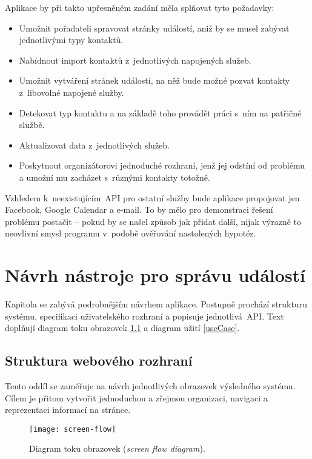 \documentclass[12pt,oneside,final]{fithesis2}
\begin{document}
Aplikace by při takto upřesněném zadání měla splňovat tyto požadavky:

\begin{itemize}
    \item Umožnit pořadateli spravovat stránky událostí, aniž by se musel zabývat jednotlivými typy kontaktů.
    \item Nabídnout import kontaktů z~jednotlivých napojených služeb.
    \item Umožnit vytváření stránek událostí, na něž bude možné pozvat kontakty z~libovolné napojené služby.
    \item Detekovat typ kontaktu a na základě toho provádět práci s~ním na patřičné službě.
    \item Aktualizovat data z~jednotlivých služeb.
    \item Poskytnout organizátorovi jednoduché rozhraní, jenž jej odstíní od pro\-blé\-mu a umožní mu zacházet s~různými kontakty totožně.
\end{itemize}

Vzhledem k~neexistujícím~API pro ostatní služby bude aplikace propojovat jen Facebook, Google Calendar a e-mail. To by mělo pro demonstraci řešení problému postačit -- pokud by se našel způsob jak přidat další, nijak výrazně to neovlivní smysl programu v~podobě ověřování nastolených hypotéz.



\chapter{Návrh nástroje pro správu událostí}
Kapitola se zabývá podrobnějším návrhem aplikace. Postupně prochází strukturu systému, specifikaci uživatelského rozhraní a popisuje jednotlivá~API. Text doplňují diagram toku obrazovek \ref{screenFlow} a diagram užití \ref{useCase}.

\section{Struktura webového rozhraní}
Tento oddíl se zaměřuje na návrh jednotlivých obrazovek výsledného systému. Cílem je přitom vytvořit jednoduchou a zřejmou organizaci, navigaci a reprezentaci informací na stránce.

\begin{figure}[p]
    \centering
    \texttt{[image: screen-flow]}
    \caption{Diagram toku obrazovek (\emph{screen flow diagram}).}
    \label{screenFlow}
\end{figure}
\end{document}
